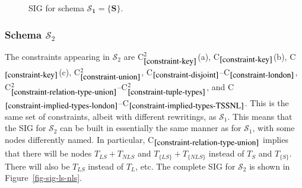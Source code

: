 \documentclass{sig-alternate-05-2015}
\newcounter{constraint}
\newcommand{\LS}{\ensuremath{\mathit{LS}}}
\newcommand{\NLS}{\ensuremath{\mathit{NLS}}}
\newcommand{\LSsub}{\ensuremath{\mathit{L}}}
\newcommand{\T}[1]{\ensuremath{T_{#1}}}
\newcommand{\TT}[1]{\ensuremath{T_{\{#1\}}}}
\newcommand{\TLSPlusNLS}{\ensuremath{\T{\LS} + \T{\NLS}}}
\newcommand{\TTLSPlusNLS}{\ensuremath{\TT{\LS} + \TT{\NLS}}}
\newcommand{\SC}[1]{\ensuremath{\mathcal{S}_{#1}}}
\begin{document}
\begin{figure*}
    \caption{SIG for schema \(\bm{\SC{1} = \{S\}}\).}
    \label{fig-sig-s}
\end{figure*}





\subsubsection{Schema \(\SC{2}\)}
\label{sec-sigs-s-ii}

\noindent The constraints appearing in \(\SC{2}\) are C\(_{\ref{constraint-key}}^{2}\)(a), C\(_{\ref{constraint-key}}\)(b), C\(_{\ref{constraint-key}}\)(c), C\(_{\ref{constraint-union}}^{2}\), C\(_{\ref{constraint-disjoint}}\)--C\(_{\ref{constraint-london}}\), C\(_{\ref{constraint-relation-type-union}}^{2}\)--C\(_{\ref{constraint-tuple-types}}^{2}\), and C\(_{\ref{constraint-implied-types-london}}\)--C\(_{\ref{constraint-implied-types-TSSNL}}\). This is the same set of constraints, albeit with different rewritings, as \(\SC{1}\). This means that the SIG for \(\SC{2}\) can be built in essentially the same manner as for \(\SC{1}\), with some nodes differently named. In particular, C\(_{\ref{constraint-relation-type-union}}\) implies that there will be nodes \(\TLSPlusNLS\) and \(\TTLSPlusNLS\) instead of \(\T{S}\) and \(\TT{S}\). There will also be \(\T{\LS}\) instead of \(\T{\LSsub}\), etc. The complete SIG for \(\SC{2}\) is shown in Figure~\ref{fig-sig-ls-nls}.

\end{document}
